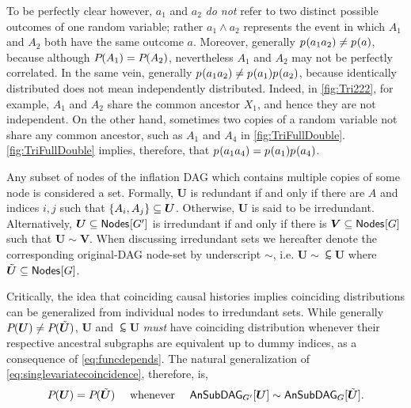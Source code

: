  
To be perfectly clear however, $a_1$ and $a_2$ \emph{do not} refer to two distinct possible outcomes of one random variable; rather $a_1\land a_2$  represents the event in which $A_1$ and $A_2$ both have the same outcome $a$. Moreover, generally $\p{a_1 a_2}\neq \p{a}$, because although $\pdf{A_1}=\pdf{A_2}$, nevertheless $A_1$ and $A_2$ may not be perfectly correlated. In the same vein, generally $\p{a_1 a_2}\neq \p{a_1}\p{a_2}$, because identically distributed does not mean independently distributed. Indeed, in \cref{fig:Tri222}, for example, $A_1$ and $A_2$ share the common ancestor $X_1$, and hence they are not independent. On the other hand, sometimes two copies of a random variable not share any common ancestor, such as $A_1$ and $A_4$ in \cref{fig:TriFullDouble}. \cref{fig:TriFullDouble} implies, therefore, that $\p{a_1 a_4}=\p{a_1}\p{a_4}$. 

Any subset of nodes of the inflation DAG which contains multiple copies of some node is considered a  set. Formally, $\bm{U}$ is redundant if and only if there are $A$ and indices $i,j$ such that $\brackets{A_i,A_j}\subseteq\bm{U}$. Otherwise, $\bm{U}$ is said to be irredundant. Alternatively, $\bm{U}\subseteq\nodes{G'}$ is irredundant if and only if there is $\bm{V}\subseteq\nodes{G}$ such that $\bm{U}\sim\bm{V}$. 
When discussing irredundant sets we hereafter denote the corresponding original-DAG node-set by underscript $\sim$, i.e.
$\bm{U}\sim\subsim{\bm{U}}$ where $\subsim{\bm{U}}\subseteq\nodes{G}$. 

Critically, the idea that coinciding causal histories implies coinciding distributions can be generalized from individual nodes to irredundant sets. While generally $\pdf{\bm{U}}\neq\pdf{\subsim{\bm{U}}}$,  $\bm{U}$ and $\subsim{\bm{U}}$ \emph{must} have coinciding distribution whenever their respective ancestral subgraphs are equivalent up to dummy indices, as a consequence of  \cref{eq:funcdepends}.
The natural generalization of \cref{eq:singlevariatecoincidence}, therefore, is,
\begin{align}\label{eq:coincidingdistrodef}
\pdf{\bm{U}}=\pdf{\subsim{\bm{U}}} \quad\text{ whenever }\quad\ansubgraph[G']{\bm{U}}\sim\ansubgraph[G]{\subsim{\bm{U}}}.
\end{align}


